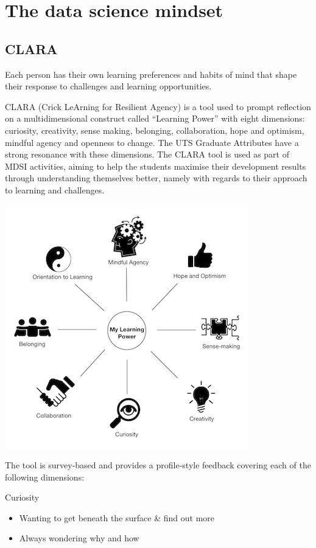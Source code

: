 \documentclass[]{book}
\providecommand{\tightlist}{%
  \setlength{\itemsep}{0pt}\setlength{\parskip}{0pt}}
\theoremstyle{definition}
\theoremstyle{definition}
\theoremstyle{remark}
\begin{document}
\chapter{The data science mindset}\label{the-data-science-mindset}

\section{CLARA}\label{clara}

Each person has their own learning preferences and habits of mind that
shape their response to challenges and learning opportunities.

CLARA (Crick LeArning for Resilient Agency) is a tool used to prompt
reflection on a multidimensional construct called ``Learning Power''
with eight dimensions: curiosity, creativity, sense making, belonging,
collaboration, hope and optimism, mindful agency and openness to change.
The UTS Graduate Attributes have a strong resonance with these
dimensions. The CLARA tool is used as part of MDSI activities, aiming to
help the students maximise their development results through
understanding themselves better, namely with regards to their approach
to learning and challenges.

\includegraphics{Images/CLARAspider.png}

The tool is survey-based and provides a profile-style feedback covering
each of the following dimensions:

Curiosity

\begin{itemize}
\tightlist
\item
  Wanting to get beneath the surface \& find out more
\item
  Always wondering why and how
\end{itemize}
\end{document}
